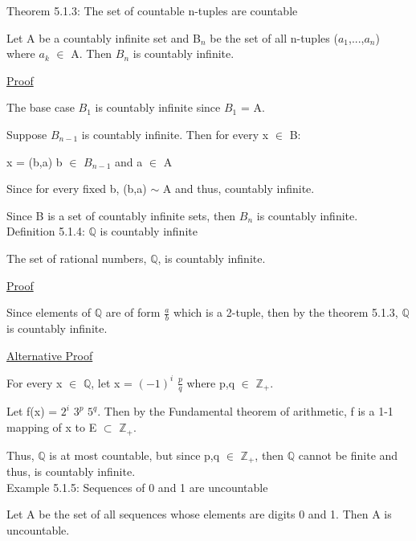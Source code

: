 { \color{red} Theorem 5.1.3: The set of countable n-tuples are countable } 

	\begin{adjustbox}{minipage=14cm, right}
		Let A be a countably infinite set and B$_n$ be the set of all
		n-tuples ($a_1$,...,$a_n$) where $a_k$ $\in$ A.
		Then $B_n$ is countably infinite.
	\end{adjustbox}

{ \color{magenta} \underline{Proof} } 
	
	The base case $B_1$ is countably infinite since $B_1$ = A.

	Suppose $B_{n-1}$ is countably infinite. Then for every x $\in$ B:

	\qquad x = (b,a) \qquad \qquad b $\in$ $B_{n-1}$ and a $\in$ A

	Since for every fixed b, (b,a) $\sim$ A and thus, countably infinite.

	Since B is a set of countably infinite sets, then $B_{n}$
	is countably infinite. \\

{ \color{blue} Definition 5.1.4: $\mathbb{Q}$ is countably infinite } 

	\begin{adjustbox}{minipage=14cm, right}
		The set of rational numbers, $\mathbb{Q}$, is countably infinite.
	\end{adjustbox}

{ \color{magenta} \underline{Proof} } 
	
	Since elements of $\mathbb{Q}$ are of form $\frac{a}{b}$ which is a
	2-tuple, then by the {\color{red} theorem 5.1.3}, $\mathbb{Q}$ is countably infinite.

{ \color{magenta} \underline{Alternative Proof} } 
	
	For every x $\in$ $\mathbb{Q}$, let x = $(-1)^i$ $\frac{p}{q}$ where p,q $\in$ $\mathbb{Z}_+$.

	Let f(x) = $2^i$ $3^p$ $5^q$. Then by the Fundamental theorem of arithmetic,
	f is a 1-1 mapping of x to E $\subset$ $\mathbb{Z}_+$.

	Thus, $\mathbb{Q}$ is at most countable, but since p,q $\in$ $\mathbb{Z}_+$,
	then $\mathbb{Q}$ cannot be finite and thus, is countably infinite. \\

{ \color{purple} Example 5.1.5: Sequences of 0 and 1 are uncountable } 

	\begin{adjustbox}{minipage=14cm, right}
		Let A be the set of all sequences whose elements are digits 0 and 1.
		Then A is uncountable.
	\end{adjustbox}

